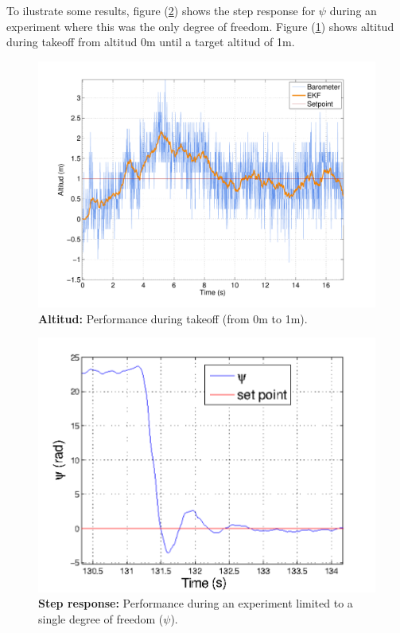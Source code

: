 \documentclass[conference]{IEEEtran}
\newcommand{\refp}[1]{(\ref{#1})}
\begin{document}
To ilustrate some results, figure \refp{fig:psi_esc.pdf} shows the step response for $\psi$ during an experiment where this was the only degree of freedom. Figure \refp{fig:altura.pdf} shows altitud during takeoff from altitud 0m until a target altitud of 1m.

\begin{figure}
	\centering
	\includegraphics[width=1\columnwidth]{./pics_paper/altura.pdf}
	\caption{\textbf{Altitud:} Performance during takeoff (from 0m to 1m).}
	\label{fig:altura.pdf}
\end{figure}

\begin{figure}
	\centering
	\includegraphics[width=1\columnwidth]{./pics_paper/psi_esc.pdf}
	\caption{\textbf{Step response:} Performance during an experiment limited to a single degree of freedom ($\psi$).}
	\label{fig:psi_esc.pdf}
\end{figure}
\end{document}
